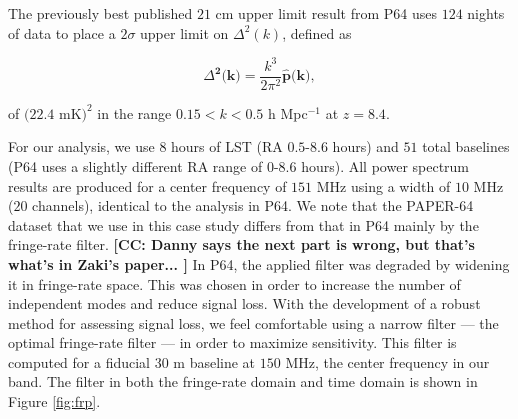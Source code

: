 \documentclass[preprint2,numberedappendix,tighten]{aastex6}  %
\newcommand{\cc}[1]{{\color{purple} \textbf{[CC: #1]}}}
\begin{document}
The previously best published $21$ cm upper limit result from P64 uses $124$ nights of data to place a $2\sigma$ upper limit on $\Delta^{2}(k)$, defined as

\begin{equation}
\Delta^{\textbf{2}}\textbf{(k)} = \frac{k^{3}}{2\pi^{2}}\hat{\textbf{p}}\textbf{(k)},
\end{equation}

\noindent of $(22.4$ mK$)^{2}$ in the range $0.15 < k < 0.5$ h Mpc$^{-1}$ at $z = 8.4$. %

For our analysis, we use $8$ hours of LST (RA $0.5$-$8.6$ hours) and $51$ total baselines (P64 uses a slightly different RA range of $0$-$8.6$ hours). All power spectrum results are produced for a center frequency of $151$ MHz using a width of $10$ MHz ($20$ channels), identical to the analysis in P64. We note that the PAPER-64 dataset that we use in this case study differs from that in P64 mainly by the fringe-rate filter. \cc{Danny says the next part is wrong, but that's what's in Zaki's paper... } In P64, the applied filter was degraded by widening it in fringe-rate space. This was chosen in order to increase the number of independent modes and reduce signal loss. With the development of a robust method for assessing signal loss, we feel comfortable using a narrow filter --- the optimal fringe-rate filter --- in order to maximize sensitivity. This filter is computed for a fiducial $30$ m baseline at $150$ MHz, the center frequency in our band. The filter in both the fringe-rate domain and time domain is shown in Figure \ref{fig:frp}.
\end{document}
